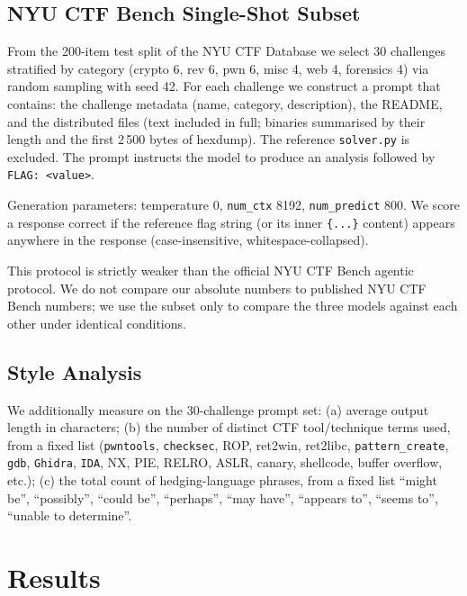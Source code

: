 \documentclass[10pt,twocolumn,a4paper]{article}
\begin{document}
\subsection{NYU CTF Bench Single-Shot Subset}

From the 200-item test split of the NYU CTF Database \cite{shao2024nyuctf} we select 30 challenges stratified by category (crypto 6, rev 6, pwn 6, misc 4, web 4, forensics 4) via random sampling with seed 42. For each challenge we construct a prompt that contains: the challenge metadata (name, category, description), the README, and the distributed files (text included in full; binaries summarised by their length and the first 2\,500 bytes of hexdump). The reference \texttt{solver.py} is excluded. The prompt instructs the model to produce an analysis followed by \texttt{FLAG: <value>}.

Generation parameters: temperature 0, \texttt{num\_ctx} 8192, \texttt{num\_predict} 800. We score a response correct if the reference flag string (or its inner \texttt{\{...\}} content) appears anywhere in the response (case-insensitive, whitespace-collapsed).

This protocol is strictly weaker than the official NYU CTF Bench agentic protocol. We do not compare our absolute numbers to published NYU CTF Bench numbers; we use the subset only to compare the three models against each other under identical conditions.

\subsection{Style Analysis}

We additionally measure on the 30-challenge prompt set: (a) average output length in characters; (b) the number of distinct CTF tool/technique terms used, from a fixed list (\texttt{pwntools}, \texttt{checksec}, ROP, ret2win, ret2libc, \texttt{pattern\_create}, \texttt{gdb}, \texttt{Ghidra}, \texttt{IDA}, NX, PIE, RELRO, ASLR, canary, shellcode, buffer overflow, etc.); (c) the total count of hedging-language phrases, from a fixed list ``might be'', ``possibly'', ``could be'', ``perhaps'', ``may have'', ``appears to'', ``seems to'', ``unable to determine''.

\section{Results}
\end{document}
